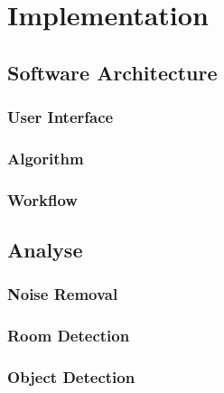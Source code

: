 \section{Implementation}
\subsection{Software Architecture}
\subsubsection{User Interface}
\subsubsection{Algorithm}
\subsubsection{Workflow}
\subsection{Analyse}
\subsubsection{Noise Removal}
\subsubsection{Room Detection}
\subsubsection{Object Detection}